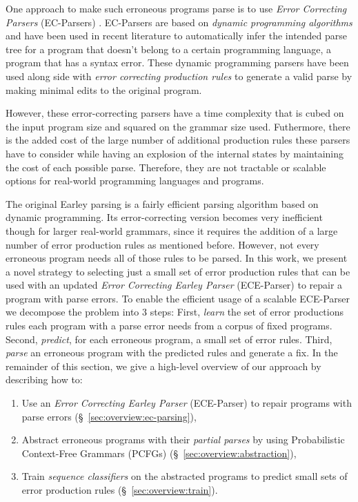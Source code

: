 One approach to make such erroneous programs parse is to use \emph{Error
Correcting Parsers} (EC-Parsers) \citep{Aho_1972}. EC-Parsers are based on
\emph{dynamic programming algorithms} and have been used in recent literature to
automatically infer the intended parse tree for a program that doesn't belong to
a certain programming language, \ie a program that has a syntax error. These
dynamic programming parsers have been used along side with \emph{error
correcting production rules} \citep{Aho_1972} to generate a valid parse by
making minimal edits to the original program.

However, these error-correcting parsers have a time complexity that is cubed on
the input program size and squared on the grammar size used. Futhermore, there
is the added cost of the large number of additional production rules these
parsers have to consider while having an explosion of the internal states by
maintaining the cost of each possible parse. Therefore, they are not tractable
or scalable options for real-world programming languages and programs.


The original Earley parsing is a fairly efficient parsing algorithm
\citep{Earley_1970} based on dynamic programming. Its error-correcting version
becomes very inefficient though for larger real-world grammars, since it
requires the addition of a large number of error production rules as mentioned
before. However, not every erroneous program needs all of those rules to be
parsed. In this work, we present a novel strategy to selecting just a small set
of error production rules that can be used with an updated \emph{Error
Correcting Earley Parser} (ECE-Parser) to repair a program with parse errors.
%
To enable the efficient usage of a scalable ECE-Parser we decompose the problem into 3
steps:
%
First, \emph{learn} the set of error productions rules each program with a parse
error needs from a corpus of fixed programs.
%
Second, \emph{predict}, for each erroneous program, a small set of error rules.
%
Third, \emph{parse} an erroneous program with the predicted rules and generate a
fix.
%
In the remainder of this section, we give a high-level overview
of our approach by describing how to:

\begin{enumerate}

  \item Use an \emph{Error Correcting Earley Parser} (ECE-Parser) to repair programs
  with parse errors (\S~\ref{sec:overview:ec-parsing}),

  \item Abstract erroneous programs with their \emph{partial parses} by using
  Probabilistic Context-Free Grammars (PCFGs)
  (\S~\ref{sec:overview:abstraction}),

  \item Train \emph{sequence classifiers} on the abstracted programs to predict
  small sets of error production rules (\S~\ref{sec:overview:train}).

\end{enumerate}

